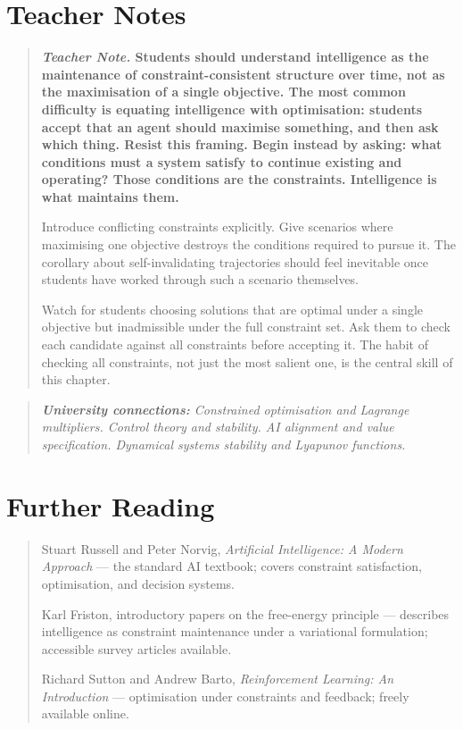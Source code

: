 \documentclass[11pt]{book}
\theoremstyle{plain}
\theoremstyle{definition}
\theoremstyle{remark}
\newenvironment{teachernote}
  {\begin{quote}\small\bfseries\textit{Teacher Note.}\normalfont\small\enspace\ignorespaces}
  {\end{quote}}
\newenvironment{universitybridge}
  {\begin{quote}\small\itshape\textbf{University connections:}\normalfont\small\itshape\enspace\ignorespaces}
  {\end{quote}}
\newenvironment{readinglist}
  {\begin{quote}\small}
  {\end{quote}}
\begin{document}
\section*{Teacher Notes}

\begin{teachernote}
Students should understand intelligence as the maintenance of
constraint-consistent structure over time, not as the maximisation of a
single objective. The most common difficulty is equating intelligence
with optimisation: students accept that an agent should maximise
something, and then ask which thing. Resist this framing. Begin instead
by asking: what conditions must a system satisfy to continue existing
and operating? Those conditions are the constraints. Intelligence is
what maintains them.

Introduce conflicting constraints explicitly. Give scenarios where
maximising one objective destroys the conditions required to pursue it.
The corollary about self-invalidating trajectories should feel
inevitable once students have worked through such a scenario themselves.

Watch for students choosing solutions that are optimal under a single
objective but inadmissible under the full constraint set. Ask them to
check each candidate against all constraints before accepting it. The
habit of checking all constraints, not just the most salient one, is
the central skill of this chapter.
\end{teachernote}

\begin{universitybridge}
Constrained optimisation and Lagrange multipliers. Control theory and
stability. AI alignment and value specification. Dynamical systems
stability and Lyapunov functions.
\end{universitybridge}

\section*{Further Reading}

\begin{readinglist}
Stuart Russell and Peter Norvig, \textit{Artificial Intelligence: A
Modern Approach} --- the standard AI textbook; covers constraint
satisfaction, optimisation, and decision systems.

Karl Friston, introductory papers on the free-energy principle ---
describes intelligence as constraint maintenance under a variational
formulation; accessible survey articles available.

Richard Sutton and Andrew Barto, \textit{Reinforcement Learning: An
Introduction} --- optimisation under constraints and feedback; freely
available online.
\end{readinglist}
\end{document}
